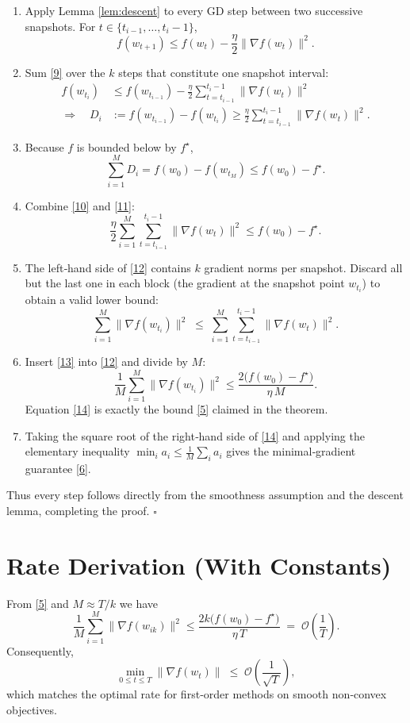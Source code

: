 \documentclass{article}
\begin{document}
\begin{enumerate}
\item[Step 1.] Apply Lemma \ref{lem:descent} to every GD step
between two successive snapshots.  For $t\in\{t_{i-1},\dots,t_{i}-1\}$,
\[
f(w_{t+1})\le f(w_{t})-\frac{\eta}{2}\|\nabla f(w_{t})\|^{2}.
\tag{9}
\]
\item[Step 2.] Sum \eqref{9} over the $k$ steps that constitute one snapshot
interval:
\[
\begin{aligned}
f(w_{t_{i}}) &\le f(w_{t_{i-1}})
-\frac{\eta}{2}\sum_{t=t_{i-1}}^{t_{i}-1}\|\nabla f(w_{t})\|^{2}\\[1mm]
\Longrightarrow\quad
D_{i}&:=f(w_{t_{i-1}})-f(w_{t_{i}})
\ge\frac{\eta}{2}\sum_{t=t_{i-1}}^{t_{i}-1}\|\nabla f(w_{t})\|^{2}.
\tag{10}
\end{aligned}
\]
\item[Step 3.] Because $f$ is bounded below by $f^{\star}$,
\[
\sum_{i=1}^{M} D_{i}=f(w_{0})-f(w_{t_{M}})
\le f(w_{0})-f^{\star}.
\tag{11}
\]
\item[Step 4.] Combine \eqref{10} and \eqref{11}:
\[
\frac{\eta}{2}\sum_{i=1}^{M}\sum_{t=t_{i-1}}^{t_{i}-1}
\|\nabla f(w_{t})\|^{2}
\le f(w_{0})-f^{\star}.
\tag{12}
\]
\item[Step 5.] The left‑hand side of \eqref{12} contains $k$ gradient norms
per snapshot.  Discard all but the last one in each block (the gradient at
the snapshot point $w_{t_{i}}$) to obtain a valid lower bound:
\[
\sum_{i=1}^{M}\|\nabla f(w_{t_{i}})\|^{2}
\;\le\;
\sum_{i=1}^{M}\sum_{t=t_{i-1}}^{t_{i}-1}\|\nabla f(w_{t})\|^{2}.
\tag{13}
\]
\item[Step 6.] Insert \eqref{13} into \eqref{12} and divide by $M$:
\[
\frac{1}{M}\sum_{i=1}^{M}\|\nabla f(w_{t_{i}})\|^{2}
\le
\frac{2\bigl(f(w_{0})-f^{\star}\bigr)}{\eta\,M}.
\tag{14}
\]
Equation \eqref{14} is exactly the bound \eqref{5} claimed in the theorem.
\item[Step 7.] Taking the square root of the right‑hand side of \eqref{14}
and applying the elementary inequality $\min_{i}a_{i}\le\frac{1}{M}\sum_{i}a_{i}$
gives the minimal‑gradient guarantee \eqref{6}.
\end{enumerate}
Thus every step follows directly from the smoothness assumption and
the descent lemma, completing the proof. \hfill $\square$

\section*{Rate Derivation (With Constants)}
From \eqref{5} and $M\approx T/k$ we have
\[
\frac{1}{M}\sum_{i=1}^{M}\|\nabla f(w_{i k})\|^{2}
\le
\frac{2k\bigl(f(w_{0})-f^{\star}\bigr)}{\eta\,T}
\;=\;
\mathcal{O}\!\left(\frac{1}{T}\right).
\]
Consequently,
\[
\min_{0\le t\le T}\|\nabla f(w_{t})\|
\;\le\;
\mathcal{O}\!\left(\frac{1}{\sqrt{T}}\right),
\]
which matches the optimal rate for first‑order methods on smooth
non‑convex objectives.
\end{document}
